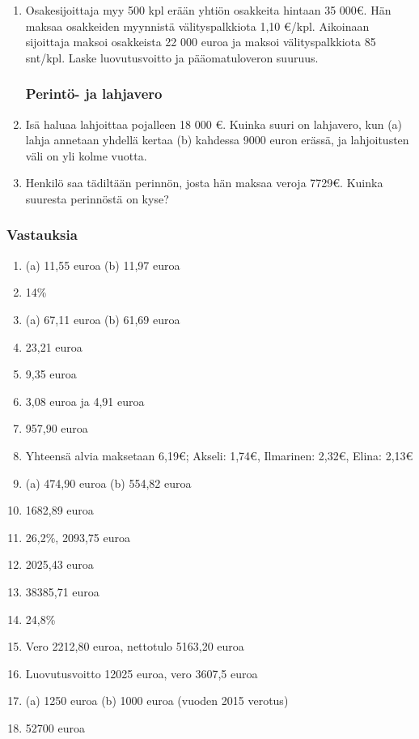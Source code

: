 \documentclass[a4paper,10pt]{article}
\begin{document}
\begin{enumerate}
\item Osakesijoittaja myy 500 kpl erään yhtiön osakkeita hintaan 35 000\euro. Hän maksaa osakkeiden myynnistä välityspalkkiota 1,10 \euro/kpl. Aikoinaan sijoittaja maksoi osakkeista 22 000 euroa ja maksoi välityspalkkiota 85 snt/kpl. Laske luovutusvoitto ja pääomatuloveron suuruus.





\subsubsection*{Perintö- ja lahjavero}
\item Isä haluaa lahjoittaa pojalleen 18 000 \euro. Kuinka suuri on lahjavero, kun (a) lahja annetaan yhdellä kertaa (b) kahdessa 9000 euron erässä, ja lahjoitusten väli on yli kolme vuotta.

\item Henkilö saa tädiltään perinnön, josta hän maksaa veroja 7729\euro. Kuinka suuresta perinnöstä on kyse?
\end{enumerate}
\subsubsection*{Vastauksia}
\begin{enumerate}
\item (a) 11,55 euroa (b) 11,97 euroa
\item 14\%
\item (a) 67,11 euroa (b) 61,69 euroa
\item 23,21 euroa
\item 9,35 euroa
\item 3,08 euroa ja 4,91 euroa
\item 957,90 euroa
\item Yhteensä alvia maksetaan 6,19\euro; Akseli: 1,74\euro, Ilmarinen: 2,32\euro, Elina: 2,13\euro
\item (a) 474,90 euroa (b) 554,82 euroa
\item 1682,89 euroa
\item 26,2\%, 2093,75 euroa
\item 2025,43 euroa
\item 38385,71 euroa
\item 24,8\%
\item Vero 2212,80 euroa, nettotulo 5163,20 euroa
\item Luovutusvoitto 12025 euroa, vero 3607,5 euroa
\item (a) 1250 euroa (b) 1000 euroa (vuoden 2015 verotus)
\item 52700 euroa
\end{enumerate}
\end{document}
